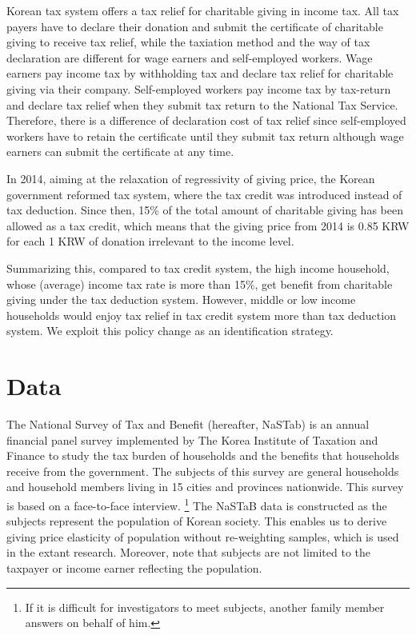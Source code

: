 \documentclass[
  11pt,
  a4paper,
]{article}
\begin{document}
Korean tax system offers a tax relief for charitable giving in income tax. All tax payers have to declare their donation and submit the certificate of charitable giving to receive tax relief, while the taxiation method and the way of tax declaration are different for wage earners and self-employed workers. Wage earners pay income tax by withholding tax and declare tax relief for charitable giving via their company. Self-employed workers pay income tax by tax-return and declare tax relief when they submit tax return to the National Tax Service. Therefore, there is a difference of declaration cost of tax relief since self-employed workers have to retain the certificate until they submit tax return although wage earners can submit the certificate at any time.

In 2014, aiming at the relaxation of regressivity of giving price, the Korean government reformed tax system, where the tax credit was introduced instead of tax deduction. Since then, 15\% of the total amount of charitable giving has been allowed as a tax credit, which means that the giving price from 2014 is 0.85 KRW for each 1 KRW of donation irrelevant to the income level.

Summarizing this, compared to tax credit system, the high income household, whose (average) income tax rate is more than 15\%, get benefit from charitable giving under the tax deduction system. However, middle or low income households would enjoy tax relief in tax credit system more than tax deduction system. We exploit this policy change as an identification strategy.

\hypertarget{data}{%
\section{Data}\label{data}}

The National Survey of Tax and Benefit (hereafter, NaSTab) is
an annual financial panel survey
implemented by The Korea Institute of Taxation and Finance
to study the tax burden of households and the benefits
that households receive from the government.
The subjects of this survey are general households and
household members living in 15 cities and provinces nationwide.
This survey is based on a face-to-face interview. \footnote{If it is difficult for investigators to meet subjects, another family member answers on behalf of him.}
The NaSTaB data is constructed
as the subjects represent the population of Korean society.
This enables us to derive giving price elasticity of population
without re-weighting samples, which is used in the extant research.
Moreover, note that subjects are not limited to the taxpayer or
income earner reflecting the population.
\end{document}
